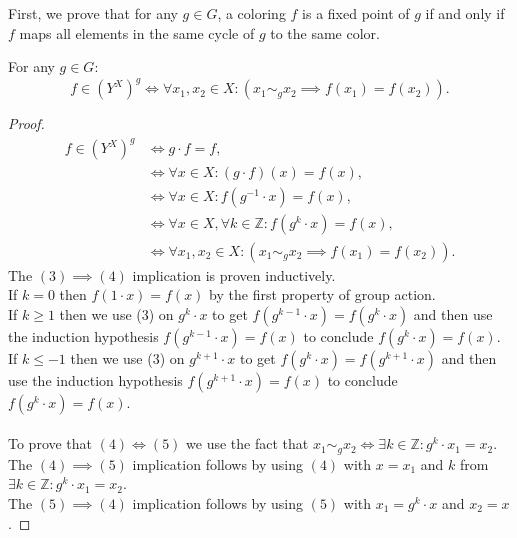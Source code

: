 First, we prove that for any $g \in G$, a coloring $f$ is a fixed point of $g$ if and only if $f$ maps all elements in the same cycle of $g$ to the same color.

\begin{proposition}
  \label{prop:f-mem-fixedBy-iff-forall-eq-to-eq}
  \leanok
  For any $g \in G$:
  \begin{equation*}
    f \in (Y^X)^g \iff \forall x_1, x_2 \in X: (x_1 \sim_g x_2 \implies f(x_1) = f(x_2)).
  \end{equation*}
\end{proposition}

\begin{proof}
  \leanok
  \begin{align}
    f \in (Y^X)^g &\iff g \cdot f = f, \\
                  &\iff \forall x \in X: (g \cdot f)(x) = f(x), \\
                  &\iff \forall x \in X: f(g^{-1} \cdot x) = f(x), \\
                  &\iff \forall x \in X, \forall k \in \mathbb{Z}: f(g^k \cdot x) = f(x), \\
                  &\iff \forall x_1, x_2 \in X: (x_1 \sim_g x_2 \implies f(x_1) = f(x_2)).
  \end{align}
  The $(3) \implies (4)$ implication is proven inductively.\\
  If $k = 0$ then $f(1 \cdot x) = f(x)$ by the first property of group action.\\
  If $k \geq 1$ then we use (3) on $g^{k} \cdot x$ to get $f(g^{k - 1} \cdot x) = f(g^k \cdot x)$ and then use the induction hypothesis $f(g^{k - 1} \cdot x) = f(x)$ to conclude $f(g^k \cdot x) = f(x)$.\\
  If $k \leq -1$ then we use (3) on $g^{k + 1} \cdot x$ to get $f(g^k \cdot x) = f(g^{k + 1} \cdot x)$ and then use the induction hypothesis $f(g^{k + 1} \cdot x) = f(x)$  to conclude $f(g^k \cdot x) = f(x)$.\\
  \\
  To prove that $(4) \iff (5)$ we use the fact that $x_1 \sim_g x_2 \iff \exists k \in \mathbb{Z}: g^k \cdot x_1 = x_2$.\\
  The $(4) \implies (5)$ implication follows by using $(4)$ with $x = x_1$ and $k$ from $\exists k \in \mathbb{Z}: g^k \cdot x_1 = x_2$.\\
  The $(5) \implies (4)$ implication follows by using $(5)$ with $x_1 = g^k \cdot x$ and $x_2 = x$.
\end{proof}

